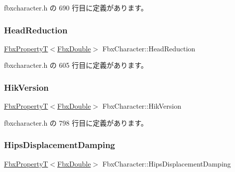  fbxcharacter.\+h の 690 行目に定義があります。

\mbox{\label{class_fbx_character_a3261e15fba332932c44dca19271d7949}} 
\subsubsection{\texorpdfstring{Head\+Reduction}{HeadReduction}}
{\footnotesize\ttfamily \hyperlink{class_fbx_property_t}{Fbx\+PropertyT}$<$\hyperlink{fbxtypes_8h_a171e72a1c46fc15c1a6c9c31948c1c5b}{Fbx\+Double}$>$ Fbx\+Character\+::\+Head\+Reduction}



 fbxcharacter.\+h の 605 行目に定義があります。

\mbox{\label{class_fbx_character_a8a71e81731d16cc1d217a44125775047}} 
\subsubsection{\texorpdfstring{Hik\+Version}{HikVersion}}
{\footnotesize\ttfamily \hyperlink{class_fbx_property_t}{Fbx\+PropertyT}$<$\hyperlink{fbxtypes_8h_a171e72a1c46fc15c1a6c9c31948c1c5b}{Fbx\+Double}$>$ Fbx\+Character\+::\+Hik\+Version}



 fbxcharacter.\+h の 798 行目に定義があります。

\mbox{\label{class_fbx_character_a47179bbdfc97e82fba27844fe2e379a3}} 
\subsubsection{\texorpdfstring{Hips\+Displacement\+Damping}{HipsDisplacementDamping}}
{\footnotesize\ttfamily \hyperlink{class_fbx_property_t}{Fbx\+PropertyT}$<$\hyperlink{fbxtypes_8h_a171e72a1c46fc15c1a6c9c31948c1c5b}{Fbx\+Double}$>$ Fbx\+Character\+::\+Hips\+Displacement\+Damping}



